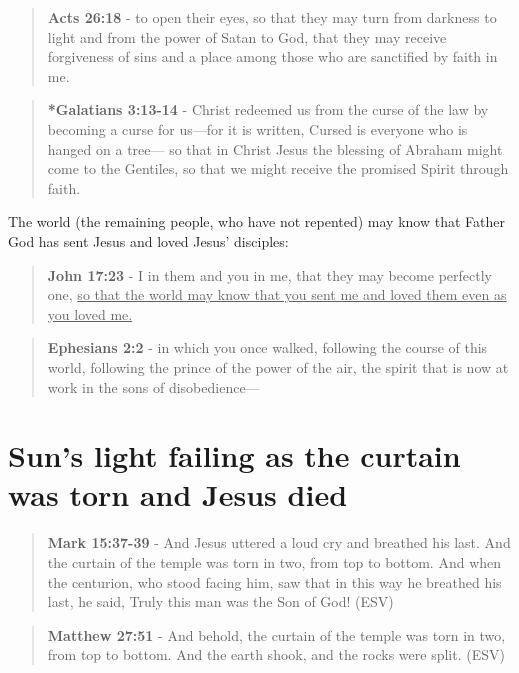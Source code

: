 \documentclass[11pt]{article}
\begin{document}
\begin{quote}
\textbf{Acts 26:18} - to open their eyes, so that they may turn from darkness to light and from the power of Satan to God, that they may receive forgiveness of sins and a place among those who are sanctified by faith in me.
\end{quote}

\begin{quote}
\textbf{*Galatians 3:13-14} - Christ redeemed us from the curse of the law by becoming a curse for us—for it is written, Cursed is everyone who is hanged on a tree— so that in Christ Jesus the blessing of Abraham might come to the Gentiles, so that we might receive the promised Spirit through faith.
\end{quote}

The world (the remaining people, who have not repented) may know that Father God has sent Jesus and loved Jesus' disciples:

\begin{quote}
\textbf{John 17:23} - I in them and you in me, that they may become perfectly one, \uline{so that the world may know that you sent me and loved them even as you loved me.}
\end{quote}

\begin{quote}
\textbf{Ephesians 2:2} - in which you once walked, following the course of this world, following the prince of the power of the air, the spirit that is now at work in the sons of disobedience—
\end{quote}

\section{Sun's light failing as the curtain was torn and Jesus died}
\label{sec:org52bc590}
\begin{quote}
\textbf{Mark 15:37-39} - And Jesus uttered a loud cry and breathed his last. And the curtain of the temple was torn in two, from top to bottom. And when the centurion, who stood facing him, saw that in this way he breathed his last, he said, Truly this man was the Son of God! (ESV)
\end{quote}

\begin{quote}
\textbf{Matthew 27:51} - And behold, the curtain of the temple was torn in two, from top to bottom. And the earth shook, and the rocks were split. (ESV)
\end{quote}
\end{document}
